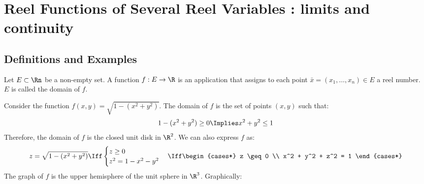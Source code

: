 \chapter{Reel Functions of Several Reel Variables : limits and continuity}

\section{Definitions and Examples}
\begin{definition}
    Let $E \subset \Rn$ be a non-empty set. A function $f: E \to \R$ is an application that assigns to each point $\bar{x} = (x_1, \ldots, x_n) \in E$ a reel number. $E$ is called the domain of $f$.
\end{definition}

\begin{eg}
    Consider the function $f(x,y) = \sqrt{1 - (x^2 + y^2)}$. The domain of $f$ is the set of points $(x,y)$ such that:
    \[
        1 - (x^2 + y^2) \geq 0 \Implies x^2 + y^2 \leq 1
    \]
    Therefore, the domain of $f$ is the closed unit disk in $\R^2$. We can also express $f$ as:
    \[
        z = \sqrt{1 - (x^2 + y^2)} \Iff \begin{cases}
            z \geq 0 \\
            z^2 = 1 - x^2 - y^2
        \end{cases} \Iff \begin{cases*}
            z \geq 0 \\
            x^2 + y^2 + z^2 = 1
        \end{cases*}
    \]
    The graph of $f$ is the upper hemisphere of the unit sphere in $\R^3$. Graphically:
  \begin{center}
\end{center}
\end{eg}

